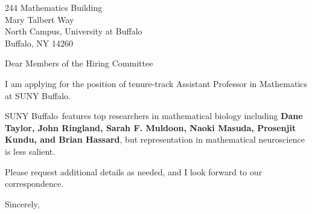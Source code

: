 




	
	
	\def\School{SUNY Buffalo}
	
	\begin{letter}
		{244 Mathematics Building\\
			Mary Talbert Way\\
			North Campus, University at Buffalo\\
			Buffalo, NY 14260
		}
		
		\opening{Dear Members of the Hiring Committee}
		
		
		I am applying for the position of tenure-track Assistant Professor in Mathematics at \School. 
		
		\School~features top researchers in mathematical biology including \textbf{Dane Taylor, John Ringland, Sarah F. Muldoon, Naoki Masuda, Prosenjit Kundu, and Brian Hassard}, but representation in mathematical neuroscience is less salient. 
		
		
		
		
		
		Please request additional details as needed, and I look forward to our correspondence.
		
		\closing{Sincerely,}
	\end{letter}
